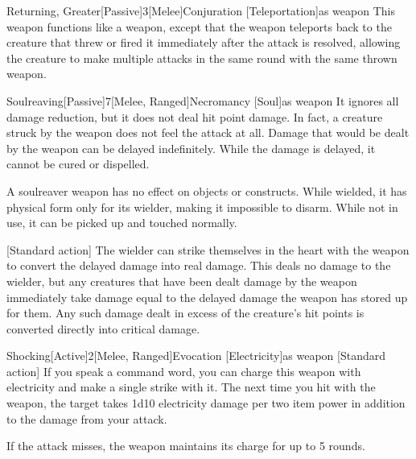 \begin{magicitemdef}{Returning, Greater}[Passive]{3}[Melee]{Conjuration [Teleportation]}{as weapon}
     This weapon functions like a  weapon, except that the weapon teleports back to the creature that threw or fired it immediately after the attack is resolved, allowing the creature to make multiple attacks in the same round with the same thrown weapon.
\end{magicitemdef}

\begin{magicitemdef}{Soulreaving}[Passive]{7}[Melee, Ranged]{Necromancy [Soul]}{as weapon}
     It ignores all damage reduction, but it does not deal hit point damage.
    In fact, a creature struck by the weapon does not feel the attack at all.
    Damage that would be dealt by the weapon can be delayed indefinitely.
    While the damage is delayed, it cannot be cured or dispelled.

    A soulreaver weapon has no effect on objects or constructs.
    While wielded, it has physical form only for its wielder, making it impossible to disarm.
    While not in use, it can be picked up and touched normally.

    [Standard action] The wielder can strike themselves in the heart with the weapon to convert the delayed damage into real damage.
    This deals no damage to the wielder, but any creatures that have been dealt damage by the weapon immediately take damage equal to the delayed damage the weapon has stored up for them.
    Any such damage dealt in excess of the creature's hit points is converted directly into critical damage.
\end{magicitemdef}

\begin{magicitemdef}{Shocking}[Active]{2}[Melee, Ranged]{Evocation [Electricity]}{as weapon}
    [Standard action] If you speak a command word, you can charge this weapon with electricity and make a single strike with it.
    The next time you hit with the weapon, the target takes 1d10 electricity damage per two item power in addition to the damage from your attack.

    If the attack misses, the weapon maintains its charge for up to 5 rounds.
\end{magicitemdef}

